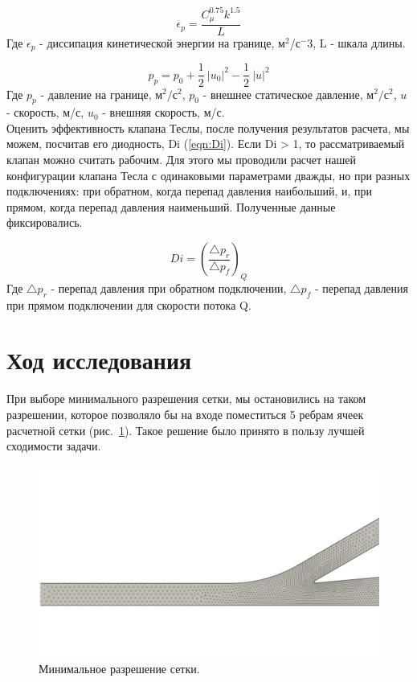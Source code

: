 \documentclass[10pt,a4paper]{book}
\begin{document}
    \begin{equation}\label{eqn:el}
        \epsilon_{p} = \frac{C_{\mu}^{0.75} k^{1.5}}{L}           
    \end{equation}
    Где $\epsilon_{p}$ - диссипация кинетической энергии на границе, м$^2$/с$^-3$, L - шкала длины.
    
    \begin{equation}\label{eqn:P0}
        p_{p} = p_{0} + \frac{1}{2}\ \left|u_{0}\right|^2 - \frac{1}{2}\ \left|u\right|^2
    \end{equation}
    Где $p_{p}$ - давление на границе, м$^{2}/$с$^{2}$, $p_{0}$ - внешнее статическое давление, м$^{2}/$с$^{2}$, $u$ - скорость, м/с, $u_{0}$ - внешняя скорость, м/с.\\
    
    Оценить эффективность клапана Теслы, после получения результатов расчета, мы можем, посчитав его диодность, Di (\ref{eqn:Di}). Если Di > 1, то рассматриваемый клапан можно считать рабочим. Для этого мы проводили расчет нашей конфигурации клапана Тесла с одинаковыми параметрами дважды, но при разных подключениях: при обратном, когда перепад давления наибольший, и, при прямом, когда перепад давления наименьший. Полученные данные фиксировались.         
    
    \begin{equation}\label{eqn:Di}
        Di = (\frac{\bigtriangleup p_{r}}{\bigtriangleup p_{f}})_Q
    \end{equation}
    Где $\bigtriangleup p_{r}$ - перепад давления при обратном подключении, $\bigtriangleup p_{f}$ - перепад давления при прямом подключении для скорости потока Q.
    
    \section{Ход исследования}
    
    При выборе минимального разрешения сетки, мы остановились на таком разрешении, которое позволяло бы на входе поместиться 5 ребрам ячеек расчетной сетки (рис.~\ref{fig:minMesh}). Такое решение было принято в пользу лучшей сходимости задачи.
    
    \begin{figure}[H]
        \centering
        \includegraphics[width = 1\linewidth]{minMesh}
        \caption{Минимальное разрешение сетки.}
        \label{fig:minMesh}
    \end{figure}
    
\end{document}
